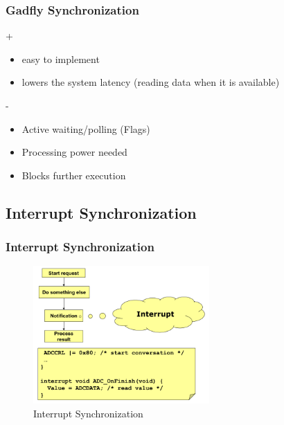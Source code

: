 \begin{frame}
    \frametitle{Gadfly Synchronization}
	\begin{exampleblock}{+}
        \begin{itemize}
			\item easy to implement
			\item lowers the system latency (reading data when it is available)         
    	\end{itemize}
   	\end{exampleblock}	
	\begin{alertblock}{-}    
    	\begin{itemize}
			\item Active waiting/polling (Flags)
			\item Processing power needed 
			\item Blocks further execution 
	     \end{itemize}
	\end{alertblock}   
\end{frame}

\subsection{Interrupt Synchronization}
\begin{frame}
    \frametitle{Interrupt Synchronization}
    \begin{figure}
        \includegraphics[width=0.6\textwidth]{fig/interrupt.png}
        \caption{Interrupt Synchronization}
    \end{figure}
        
\end{frame}

